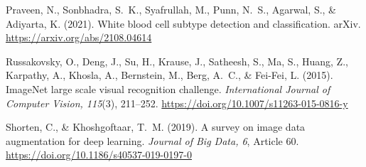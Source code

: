 \documentclass[11pt]{article}
\begin{document}
Praveen, N., Sonbhadra, S.~K., Syafrullah, M., Punn, N.~S., Agarwal, S., \& Adiyarta, K. (2021). White blood cell subtype detection and classification. arXiv. \url{https://arxiv.org/abs/2108.04614}

Russakovsky, O., Deng, J., Su, H., Krause, J., Satheesh, S., Ma, S., Huang, Z., Karpathy, A., Khosla, A., Bernstein, M., Berg, A.~C., \& Fei-Fei, L. (2015). ImageNet large scale visual recognition challenge. \textit{International Journal of Computer Vision, 115}(3), 211--252. \url{https://doi.org/10.1007/s11263-015-0816-y}

Shorten, C., \& Khoshgoftaar, T.~M. (2019). A survey on image data augmentation for deep learning. \textit{Journal of Big Data, 6}, Article 60. \url{https://doi.org/10.1186/s40537-019-0197-0}
\end{document}
